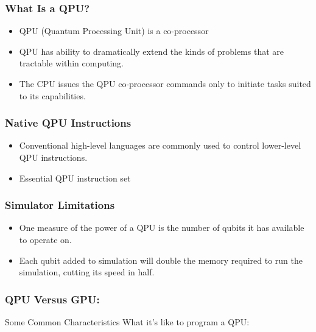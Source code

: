 \documentclass[]{article}
\begin{document}
\hypertarget{header-n1909}{%
\subsubsection{What Is a QPU? }\label{header-n1909}}

\begin{itemize}
\item
  QPU (Quantum Processing Unit) is a co-processor 
\item
  QPU has ability to dramatically extend the kinds of problems that are
  tractable within computing. 
\item
  The CPU issues the QPU co-processor commands only to initiate tasks
  suited to its capabilities.
\end{itemize}

\hypertarget{header-n1917}{%
\subsubsection{Native QPU Instructions }\label{header-n1917}}

\begin{itemize}
\item
  Conventional high-level languages are commonly used to control
  lower-level QPU instructions. 
\item
  Essential QPU instruction set 
\end{itemize}

\hypertarget{header-n1923}{%
\subsubsection{Simulator Limitations }\label{header-n1923}}

\begin{itemize}
\item
  One measure of the power of a QPU is the number of qubits it has
  available to operate on. 
\item
  Each qubit added to simulation will double the memory required to run
  the simulation, cutting its speed in half.
\end{itemize}

\hypertarget{header-n1929}{%
\subsubsection{QPU Versus GPU: }\label{header-n1929}}

Some Common Characteristics What it's like to program a QPU:
\end{document}
